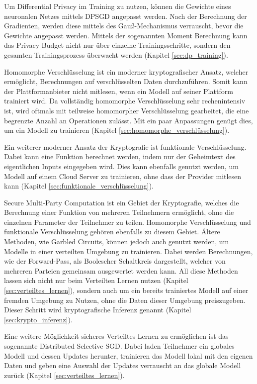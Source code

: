 Um Differential Privacy im Training zu nutzen, können die Gewichte eines neuronalen Netzes mittels DPSGD angepasst werden.
Nach der Berechnung der Gradienten, werden diese mittels des Gauß-Mechanismus verrauscht, bevor die Gewichte angepasst werden.
Mittels der sogenannten Moment Berechnung kann das Privacy Budget nicht nur über einzelne Trainingsschritte, sondern den gesamten Trainingsprozess überwacht werden (Kapitel \ref{sec:dp_training}).

Homomorphe Verschlüsselung ist ein moderner kryptografischer Ansatz, welcher ermöglicht, Berechnungen auf verschlüsselten Daten durchzuführen.
Somit kann der Plattformanbieter nicht mitlesen, wenn ein Modell auf seiner Plattform trainiert wird.
Da vollständig homomorphe Verschlüsselung sehr rechenintensiv ist, wird oftmals mit teilweise homomorpher Verschlüsselung gearbeitet, die eine begrenzte Anzahl an Operationen zulässt.
Mit ein paar Anpassungen genügt dies, um ein Modell zu trainieren (Kapitel \ref{sec:homomorphe_verschlüsselung}).

Ein weiterer moderner Ansatz der Kryptografie ist funktionale Verschlüsselung.
Dabei kann eine Funktion berechnet werden, indem nur der Geheimtext des eigentlichen Inputs eingegeben wird.
Dies kann ebenfalls genutzt werden, um Modell auf einem Cloud Server zu trainieren, ohne dass der Provider mitlesen kann (Kapitel \ref{sec:funktionale_verschlüsselung}).

Secure Multi-Party Computation ist ein Gebiet der Kryptografie, welches die Berechnung einer Funktion von mehreren Teilnehmern ermöglicht, ohne die einzelnen Parameter der Teilnehmer zu teilen.
Homomorphe Verschlüsselung und funktionale Verschlüsselung gehören ebenfalls zu diesem Gebiet.
Ältere Methoden, wie Garbled Circuits, können jedoch auch genutzt werden, um Modelle in einer verteilten Umgebung zu trainieren. 
Dabei werden Berechnungen, wie der Forward-Pass, als Boolescher Schaltkreis dargestellt, welcher von mehreren Parteien gemeinsam ausgewertet werden kann.
All diese Methoden lassen sich nicht nur beim Verteilten Lernen nutzen (Kapitel \ref{sec:verteiltes_lernen}), sondern auch um ein bereits trainiertes Modell auf einer fremden Umgebung zu Nutzen, ohne die Daten dieser Umgebung preiszugeben. 
Dieser Schritt wird kryptografische Inferenz genannt (Kapitel \ref{sec:krypto_inferenz}). 

Eine weitere Möglichkeit sicheres Verteiltes Lernen zu ermöglichen ist das sogenannte Distributed Selective SGD. 
Dabei laden Teilnehmer ein globales Modell und dessen Updates herunter, trainieren das Modell lokal mit den eigenen Daten und geben eine Auswahl der Updates verrauscht an das globale Modell zurück (Kapitel \ref{sec:verteiltes_lernen}).

